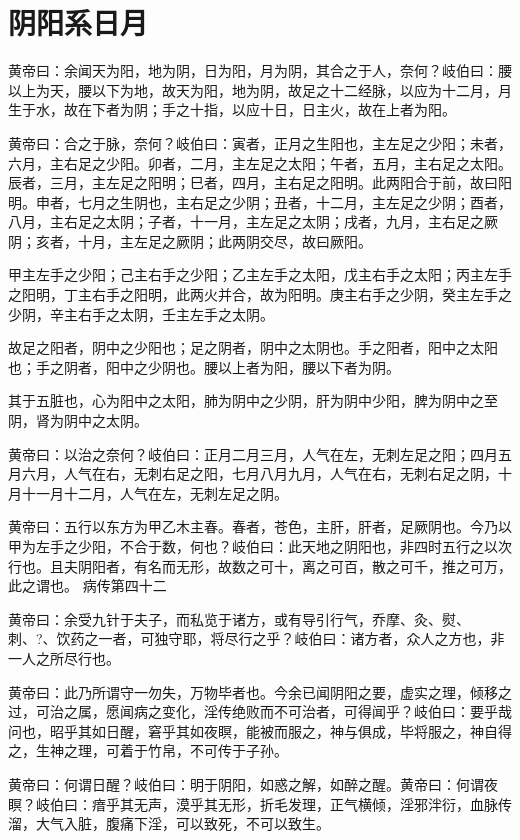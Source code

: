 \documentclass[a4paper,12pt,UTF8,twoside]{ctexbook}
\begin{document}
	\chapter{阴阳系日月}
	
	黄帝曰：余闻天为阳，地为阴，日为阳，月为阴，其合之于人，奈何？岐伯曰：腰以上为天，腰以下为地，故天为阳，地为阴，故足之十二经脉，以应为十二月，月生于水，故在下者为阴；手之十指，以应十日，日主火，故在上者为阳。
	
	黄帝曰：合之于脉，奈何？岐伯曰：寅者，正月之生阳也，主左足之少阳；未者，六月，主右足之少阳。卯者，二月，主左足之太阳；午者，五月，主右足之太阳。辰者，三月，主左足之阳明；巳者，四月，主右足之阳明。此两阳合于前，故曰阳明。申者，七月之生阴也，主右足之少阴；丑者，十二月，主左足之少阴；酉者，八月，主右足之太阴；子者，十一月，主左足之太阴；戌者，九月，主右足之厥阴；亥者，十月，主左足之厥阴；此两阴交尽，故曰厥阳。
	
	甲主左手之少阳；己主右手之少阳；乙主左手之太阳，戊主右手之太阳；丙主左手之阳明，丁主右手之阳明，此两火并合，故为阳明。庚主右手之少阴，癸主左手之少阴，辛主右手之太阴，壬主左手之太阴。
	
	故足之阳者，阴中之少阳也；足之阴者，阴中之太阴也。手之阳者，阳中之太阳也；手之阴者，阳中之少阴也。腰以上者为阳，腰以下者为阴。
	
	其于五脏也，心为阳中之太阳，肺为阴中之少阴，肝为阴中少阳，脾为阴中之至阴，肾为阴中之太阴。
	
	黄帝曰：以治之奈何？岐伯曰：正月二月三月，人气在左，无刺左足之阳；四月五月六月，人气在右，无刺右足之阳，七月八月九月，人气在右，无刺右足之阴，十月十一月十二月，人气在左，无刺左足之阴。
	
	黄帝曰：五行以东方为甲乙木主春。春者，苍色，主肝，肝者，足厥阴也。今乃以甲为左手之少阳，不合于数，何也？岐伯曰：此天地之阴阳也，非四时五行之以次行也。且夫阴阳者，有名而无形，故数之可十，离之可百，散之可千，推之可万，此之谓也。
	病传第四十二
	
	黄帝曰：余受九针于夫子，而私览于诸方，或有导引行气，乔摩、灸、熨、刺、?、饮药之一者，可独守耶，将尽行之乎？岐伯曰：诸方者，众人之方也，非一人之所尽行也。
	
	黄帝曰：此乃所谓守一勿失，万物毕者也。今余已闻阴阳之要，虚实之理，倾移之过，可治之属，愿闻病之变化，淫传绝败而不可治者，可得闻乎？岐伯曰：要乎哉问也，昭乎其如日醒，窘乎其如夜瞑，能被而服之，神与俱成，毕将服之，神自得之，生神之理，可着于竹帛，不可传于子孙。
	
	黄帝曰：何谓日醒？岐伯曰：明于阴阳，如惑之解，如醉之醒。黄帝曰：何谓夜瞑？岐伯曰：瘖乎其无声，漠乎其无形，折毛发理，正气横倾，淫邪泮衍，血脉传溜，大气入脏，腹痛下淫，可以致死，不可以致生。
	
\end{document}
